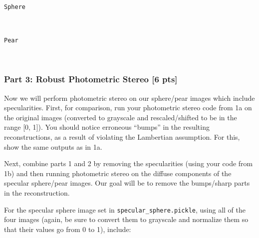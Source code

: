 \documentclass[11pt]{article}
\begin{document}
    \begin{Verbatim}[commandchars=\\\{\}]
Sphere
    \end{Verbatim}

    \begin{center}
    \end{center}
    { \hspace*{\fill} \\}
    
    \begin{Verbatim}[commandchars=\\\{\}]
Pear
    \end{Verbatim}

    \begin{center}
    \end{center}
    { \hspace*{\fill} \\}
    
    \hypertarget{part-3-robust-photometric-stereo-6-pts}{%
\subsubsection{Part 3: Robust Photometric Stereo {[}6
pts{]}}\label{part-3-robust-photometric-stereo-6-pts}}

Now we will perform photometric stereo on our sphere/pear images which
include specularities. First, for comparison, run your photometric
stereo code from 1a on the original images (converted to grayscale and
rescaled/shifted to be in the range {[}0, 1{]}). You should notice
erroneous ``bumps'' in the resulting reconstructions, as a result of
violating the Lambertian assumption. For this, show the same outputs as
in 1a.

Next, combine parts 1 and 2 by removing the specularities (using your
code from 1b) and then running photometric stereo on the diffuse
components of the specular sphere/pear images. Our goal will be to
remove the bumps/sharp parts in the reconstruction.

For the specular sphere image set in \texttt{specular\_sphere.pickle},
using all of the four images (again, be sure to convert them to
grayscale and normalize them so that their values go from 0 to 1),
include:
\end{document}
